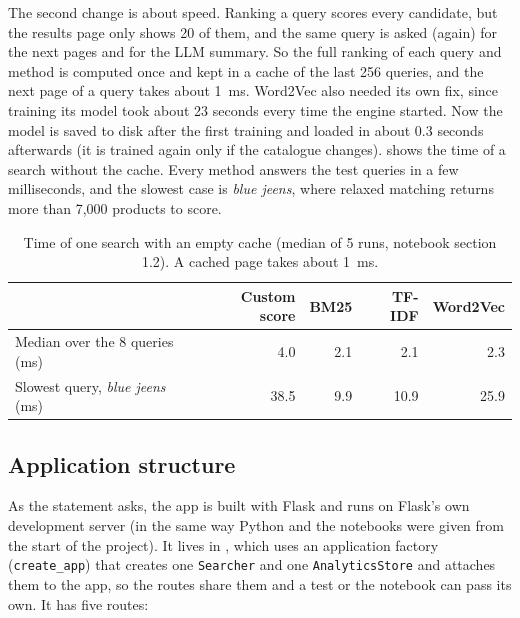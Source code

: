 \documentclass[11pt,a4paper]{article}
\begin{document}
The second change is about speed. Ranking a query scores every candidate, but the results page only shows 20 of them, and the same query is asked (again) for the next pages and for the LLM summary. So the full ranking of each query and method is computed once and kept in a cache of the last 256 queries, and the next page of a query takes about 1~ms. Word2Vec also needed its own fix, since training its model took about 23 seconds every time the engine started. Now the model is saved to disk after the first training and loaded in about 0.3 seconds afterwards (it is trained again only if the catalogue changes).  shows the time of a search without the cache. Every method answers the test queries in a few milliseconds, and the slowest case is \emph{blue jeens}, where relaxed matching returns more than 7,000 products to score.

\begin{table}[ht]
  \centering
  \begin{tabular}{lrrrr}
    \toprule
    & Custom score & BM25 & TF-IDF & Word2Vec \\
    \midrule
    Median over the 8 queries (ms) & 4.0 & 2.1 & 2.1 & 2.3 \\
    Slowest query, \emph{blue jeens} (ms) & 38.5 & 9.9 & 10.9 & 25.9 \\
    \bottomrule
  \end{tabular}
  \caption{Time of one search with an empty cache (median of 5 runs, notebook section 1.2). A cached page takes about 1~ms.}
  \label{tab:speed}
\end{table}

\subsection{Application structure}

As the statement asks, the app is built with Flask and runs on Flask's own development server (in the same way Python and the notebooks were given from the start of the project). It lives in , which uses an application factory (\texttt{create\_app}) that creates one \texttt{Searcher} and one \texttt{AnalyticsStore} and attaches them to the app, so the routes share them and a test or the notebook can pass its own. It has five routes:
\end{document}
